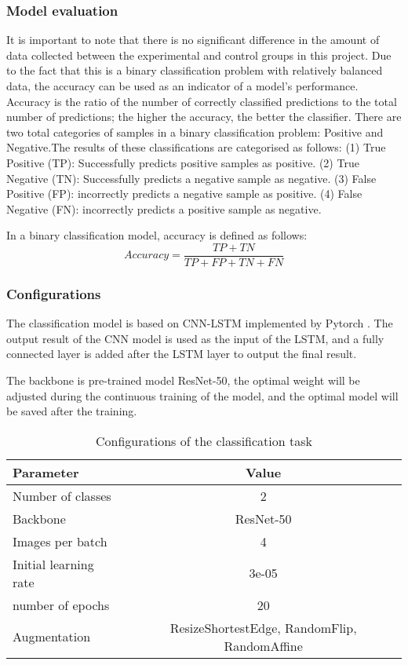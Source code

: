 \documentclass[11pt,a4paper]{article}
\begin{document}
\begin{spacing}{1.5}
\subsubsection{Model evaluation}
It is important to note that there is no significant difference in the amount of data collected between the experimental and control groups in this project. Due to the fact that this is a binary classification problem with relatively balanced data, the accuracy can be used as an indicator of a model's performance.
Accuracy is the ratio of the number of correctly classified predictions to the total number of predictions; the higher the accuracy, the better the classifier.
There are two total categories of samples in a binary classification problem: Positive and Negative.The results of these classifications are categorised as follows:
(1) True Positive (TP): Successfully predicts positive samples as positive.
(2) True Negative (TN): Successfully predicts a negative sample as negative.
(3) False Positive (FP): incorrectly predicts a negative sample as positive.
(4) False Negative (FN): incorrectly predicts a positive sample as negative.

In a binary classification model, accuracy is defined as follows:
$$
Accuracy = {\frac{TP+TN}{TP+FP+TN+FN}}
$$

\subsubsection{Configurations}
The classification model is based on CNN-LSTM implemented by Pytorch \citep{paszke2019pytorch}. The output result of the CNN model is used as the input of the LSTM, and a fully connected layer is added after the LSTM layer to output the final result.

The backbone is pre-trained model ResNet-50, the optimal weight will be adjusted during the continuous training of the model, and the optimal model will be saved after the training.


\begin{table}[H]
\centering
\caption{Configurations of the classification task}
\begin{tabular}{lc}
\hline
Parameter & Value\\
\hline
Number of classes & 2\\
Backbone & ResNet-50\\
Images per batch & 4\\
Initial learning rate & 3e-05\\
number of epochs & 20\\
Augmentation & ResizeShortestEdge, RandomFlip, RandomAffine\\
\hline
\end{tabular}
\label{tab:classification}
\end{table}


\end{spacing}
\end{document}
